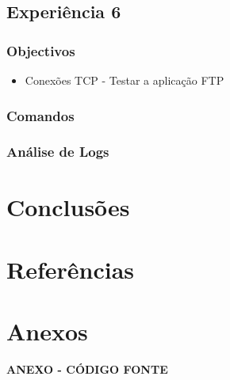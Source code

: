 \documentclass[a4paper,11pt]{article}
\begin{document}
\subsection{Experiência 6}
\subsubsection{Objectivos}

\begin{itemize}
\item Conexões TCP - Testar a aplicação FTP
\end{itemize}

\subsubsection{Comandos}

\subsubsection{Análise de Logs}

\section{Conclusões}

\section{Referências}

\section{Anexos}

\newpage

\vspace*{\fill} 
\centering
\begin{Huge}\textbf{ANEXO - CÓDIGO FONTE}\end{Huge}
\vspace*{\fill}
\thispagestyle{empty}
\setcounter{page}{1}
\end{document}
